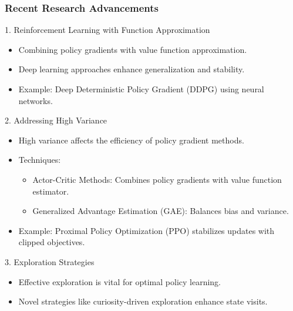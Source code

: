 \documentclass[aspectratio=169]{beamer}
\begin{document}
\begin{frame}[fragile]
  \frametitle{Recent Research Advancements}
  \begin{block}{1. Reinforcement Learning with Function Approximation}
    \begin{itemize}
      \item Combining policy gradients with value function approximation.
      \item Deep learning approaches enhance generalization and stability.
      \item Example: Deep Deterministic Policy Gradient (DDPG) using neural networks.
    \end{itemize}
  \end{block}

  \begin{block}{2. Addressing High Variance}
    \begin{itemize}
      \item High variance affects the efficiency of policy gradient methods.
      \item Techniques:
      \begin{itemize}
        \item Actor-Critic Methods: Combines policy gradients with value function estimator.
        \item Generalized Advantage Estimation (GAE): Balances bias and variance.
      \end{itemize}
      \item Example: Proximal Policy Optimization (PPO) stabilizes updates with clipped objectives.
    \end{itemize}
  \end{block}

  \begin{block}{3. Exploration Strategies}
    \begin{itemize}
      \item Effective exploration is vital for optimal policy learning.
      \item Novel strategies like curiosity-driven exploration enhance state visits.
    \end{itemize}
  \end{block}
\end{frame}
\end{document}
